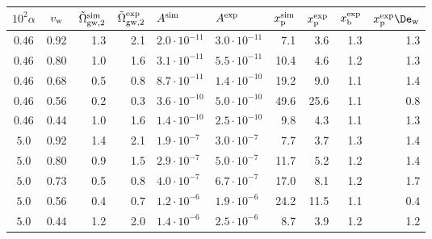 \begin{tabular}{cc | rr | ll | rr | rr}
\hline\hline
$10^2\alpha$ & $v_{\rm w}$ & $\tilde\Omega_{\rm gw,2}^{\rm sim}$ & $\tilde\Omega_{\rm gw,2}^{\rm exp}$ & \hspace{1em} $A^{\rm sim}$ & \hspace{1em} $A^{\rm exp}$ & $x_{\rm p}^{\rm sim}$ & $x_{\rm p}^{\rm exp}$ & $x_{\rm b}^{\rm exp}$ & $x_{\rm p}^{\rm exp}\De_\text{w}$ \\ 
\hline
$ 0.46 $ & 0.92 & 1.3 & 2.1 & $ 2.0\cdot 10^{-11} $ & $ 3.0\cdot 10^{-11} $ &  7.1 &  3.6 & 1.3 & 1.3 \\ 
$ 0.46 $ & 0.80 & 1.0 & 1.6 & $ 3.1\cdot 10^{-11} $ & $ 5.5\cdot 10^{-11} $ & 10.4 &  4.6 & 1.2 & 1.3 \\ 
$ 0.46 $ & 0.68 & 0.5 & 0.8 & $ 8.7\cdot 10^{-11} $ & $ 1.4\cdot 10^{-10} $ & 19.2 &  9.0 & 1.1 & 1.4 \\ 
$ 0.46 $ & 0.56 & 0.2 & 0.3 & $ 3.6\cdot 10^{-10} $ & $ 5.0\cdot 10^{-10} $ & 49.6 & 25.6 & 1.1 & 0.8 \\ 
$ 0.46 $ & 0.44 & 1.0 & 1.6 & $ 1.4\cdot 10^{-10} $ & $ 2.5\cdot 10^{-10} $ &  9.8 &  4.3 & 1.1 & 1.3 \\ 
$ 5.0 $ & 0.92 & 1.4 & 2.1 & $ 1.9\cdot 10^{-7} $ & $ 3.0\cdot 10^{-7} $ &  7.7 &  3.7 & 1.3 & 1.4 \\ 
$ 5.0 $ & 0.80 & 0.9 & 1.5 & $ 2.9\cdot 10^{-7} $ & $ 5.0\cdot 10^{-7} $ & 11.7 &  5.2 & 1.2 & 1.4 \\ 
$ 5.0 $ & 0.73 & 0.5 & 0.8 & $ 4.0\cdot 10^{-7} $ & $ 6.7\cdot 10^{-7} $ & 17.0 &  8.1 & 1.2 & 1.7 \\ 
$ 5.0 $ & 0.56 & 0.4 & 0.7 & $ 1.2\cdot 10^{-6} $ & $ 1.9\cdot 10^{-6} $ & 24.2 & 11.5 & 1.1 & 0.4 \\ 
$ 5.0 $ & 0.44 & 1.2 & 2.0 & $ 1.4\cdot 10^{-6} $ & $ 2.5\cdot 10^{-6} $ &  8.7 &  3.9 & 1.2 & 1.2 \\ 
\hline\hline
\end{tabular} 
